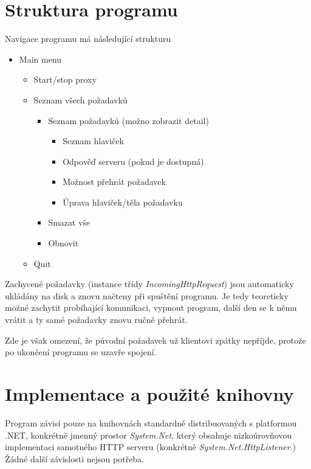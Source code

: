 \documentclass{article}
\begin{document}
\section{Struktura programu}

Navigace programu má následující strukturu

\begin{itemize}
	\item Main menu
	\begin{itemize}
		\item Start/stop proxy
		\item Seznam všech požadavků
		\begin{itemize}
			\item Seznam požadavků (možno zobrazit detail)
			\begin{itemize}
				\item Seznam hlaviček
				\item Odpověď serveru (pokud je dostupná)
				\item Možnost přehrát požadavek
				\item Úprava hlaviček/těla požadavku
			\end{itemize}
			\item Smazat vše
			\item Obnovit
		\end{itemize}
		\item Quit
	\end{itemize}
\end{itemize}

Zachycené požadavky (instance třídy \emph{IncomingHttpRequest}) jsou automaticky ukládány na disk a znovu načteny při spuštění programu. Je tedy teoreticky možné zachytit probíhající komunikaci, vypnout program, další den se k němu vrátit a ty samé požadavky znovu ručně přehrát.

Zde je však omezení, že původní požadavek už klientovi zpátky nepříjde, protože po ukončení programu se uzavře spojení.

\section{Implementace a použité knihovny}

Program závisí pouze na knihovnách standardně distribuovaných s platformou .NET, konkrétně jmenný prostor \emph{System.Net}, který obsahuje nizkoúrovňovou implementaci samotného HTTP serveru (konkrétně \emph{System.Net.HttpListener}.) Žádné další závislosti nejsou potřeba.
\end{document}

